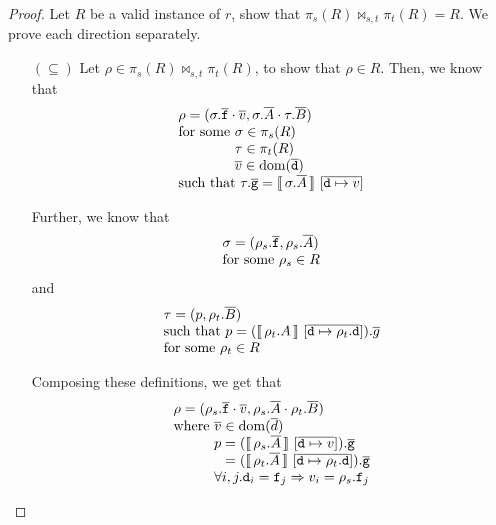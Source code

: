 
\begin{proof}
  Let $R$ be a valid instance of $r$, show that
  $\pi_s(R) \bowtie_{s,t} \pi_t(R) = R$. We prove each direction
  separately.
  \begin{enumerate}[align=left]
  \item[$(\subseteq)$] Let $\rho \in \pi_s(R) \bowtie_{s,t} \pi_t(R)$,
    to show that $\rho \in R$. Then, we know that
    \[\begin{array}l
        \rho = (\sigma.\vec{\var f} \cdot \vec v, \sigma.\vec A \cdot \tau.\vec B)\\
        \text{for some } \sigma \in \pi_s(R)\\
        \phantom{\text{for some }}\tau \in \pi_t(R)\\
        \phantom{\text{for some }} \vec v \in \dom(\vec{\var d})\\ 
        \text{such that } \tau.\vec{\var g} = \bracbb{\sigma.\vec A}~[\overline{\var d \mapsto v}] %
      \end{array} \]

    Further, we know that
    \[\begin{array}l
        \sigma = (\rho_s.\vec{\var f}, \rho_s.\vec A)\\
        \text{for some } \rho_s \in R\\
      \end{array}
    \]
    and
    \[\begin{array}l  
        \tau = (p, \rho_t.\vec B) \\
        \text{such that } p = (\bracbb{\rho_t.A}~[\overline{\var d \mapsto \rho_t.\var d}]).\vec g \\
        \text{for some } \rho_t \in R
      \end{array}\]

    Composing these definitions, we get that
    \[\begin{array}l
        \rho = (\rho_s.\vec{\var f} \cdot \vec v, \rho_s.\vec A \cdot \rho_t.\vec B) \\
        \text{where } \vec v \in \dom(\vec d)\\
        \phantom{\text{where }} p = (\bracbb{\rho_s.\vec A}~[\overline{\var d \mapsto v}]).\vec{\var g}\\
        \phantom{\text{where } p} = (\bracbb{\rho_t.\vec A}~[\overline{\var d \mapsto \rho_t.\var d}]).\vec{\var g} \\
        \phantom{\text{where }} \forall i,j. \var d_i = \var f_j \Rightarrow v_i = \rho_s.\var f_j
      \end{array}\]
    

\end{enumerate}
\end{proof}
